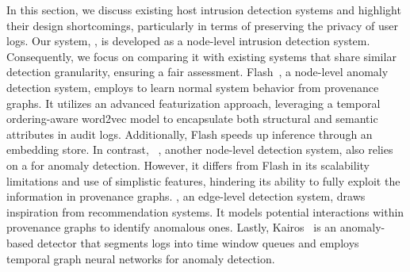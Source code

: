In this section, we discuss existing host intrusion detection systems and highlight their design shortcomings, particularly in terms of preserving the privacy of user logs. Our system, \Sys, is developed as a node-level intrusion detection system. Consequently, we focus on comparing it with existing systems that share similar detection granularity, ensuring a fair assessment. Flash~\cite{flash2024}, a node-level anomaly detection system, employs \gnn to learn normal system behavior from provenance graphs. It utilizes an advanced featurization approach, leveraging a temporal ordering-aware word2vec model to encapsulate both structural and semantic attributes in audit logs. Additionally, Flash speeds up inference through an \gnnshort embedding store. In contrast, \threatrace~\cite{wang2022threatrace}, another node-level detection system, also relies on a \gnn for anomaly detection. However, it differs from Flash in its scalability limitations and use of simplistic features, hindering its ability to fully exploit the information in provenance graphs. \shadewatcher, an edge-level detection system, draws inspiration from recommendation systems. It models potential interactions within provenance graphs to identify anomalous ones. Lastly, Kairos~\cite{cheng2023kairos} is an anomaly-based detector that segments logs into time window queues and employs temporal graph neural networks for anomaly detection.